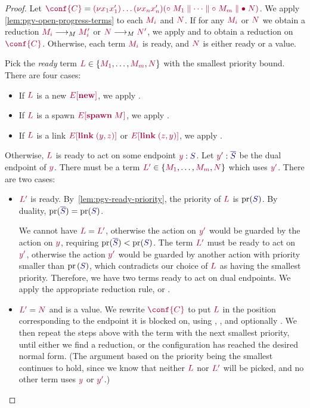 \begin{proof}
  \label{prf:thm-pgv-closed-progress-confs}
  Let $\tm{\conf{C}}=\tm{\res{x_1}{x'_1}{\dots\res{x_n}{x'_n}{(\child\;M_1\parallel\dots\parallel\child\;M_m\parallel\main\;N)}}}$.
  We apply \cref{lem:pgv-open-progress-terms} to each $\tm{M_i}$ and $\tm{N}$. If for any $\tm{M_i}$ or $\tm{N}$ we obtain a reduction $\tm{M_i}\tred\tm{M'_i}$ or $\tm{N}\tred\tm{N'}$, we apply  and  to obtain a reduction on $\tm{\conf{C}}$.
  Otherwise, each term $\tm{M_i}$ is ready, and $\tm{N}$ is either ready or a value.

  Pick the \emph{ready} term $\tm{L}\in\{\tm{M_1},\dots,\tm{M_m},\tm{N}\}$ with the smallest priority bound. There are four cases:
  \begin{itemize}
  \item
    If $\tm{L}$ is a new $\tm{\plug{E}{\new}}$, we apply .
  \item
    If $\tm{L}$ is a spawn $\tm{\plug{E}{\spawn\;M}}$, we apply .
  \item
    If $\tm{L}$ is a link $\tm{\plug{E}{\link\;\pair{y}{z}}}$ or $\tm{\plug{E}{\link\;\pair{z}{y}}}$, we apply .
  \end{itemize}
  Otherwise, $\tm{L}$ is ready to act on some endpoint $\tmty{y}{S}$. Let $\tmty{y'}{\co{S}}$ be the dual endpoint of $\tm{y}$. There must be a term $\tm{L'}\in\{\tm{M_1},\dots,\tm{M_m},\tm{N}\}$ which uses $\tm{y'}$. There are two cases:
  \begin{itemize}
  \item
    $\tm{L'}$ is ready. By~\cref{lem:pgv-ready-priority}, the priority of $\tm{L}$ is $\pr(\ty{S})$. By duality, $\pr(\ty{\co{S}})=\pr(\ty{S})$.

    We cannot have $\tm{L}=\tm{L'}$, otherwise the action on $\tm{y'}$ would be guarded by the action on $\tm{y}$, requiring $\pr(\ty{\co{S}})<\pr(\ty{S})$. The term $\tm{L'}$ must be ready to act on $\tm{y'}$, otherwise the action $\tm{y'}$ would be guarded by another action with priority smaller than $\pr{(\ty{S})}$, which contradicts our choice of $\tm{L}$ as having the smallest priority. Therefore, we have two terms ready to act on dual endpoints. We apply the appropriate reduction rule, \ie {} or .
  \item
    $\tm{L'}=\tm{N}$ and is a value. We rewrite $\tm{\conf{C}}$ to put $\tm{L}$ in the position corresponding to the endpoint it is blocked on, using , , and optionally . We then repeat the steps above with the term with the next smallest priority, until either we find a reduction, or the configuration has reached the desired normal form. (The argument based on the priority being the smallest continues to hold, since we know that neither $\tm{L}$ nor $\tm{L'}$ will be picked, and no other term uses $\tm{y}$ or $\tm{y'}$.)
  \end{itemize} 
\end{proof}

